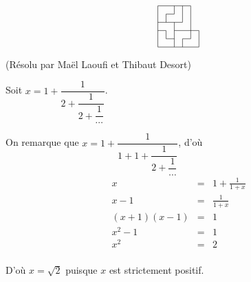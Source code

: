 \begin{sol}[34]
\[\begin{tikzpicture}[scale=0.3]
\draw (0, 0)--(0,5 );
\draw (1, 1)--(1,2 );
\draw (1, 3)--(1,4 );
\draw (2, 0)--(2,3 );
\draw (2, 4)--(2,5 );
\draw (3, 0)--(3,1 );
\draw (3, 3)--(3,5 );
\draw (4, 1)--(4,5 );
\draw (5, 0)--(5,2 );

\draw(0,0)--(5,0);
\draw(1,1)--(2,1);
\draw(3,1)--(4,1);
\draw(0,2)--(1,2);
\draw(2,2)--(5,2);
\draw(0,3)--(3,3);
\draw(1,4)--(2,4);
\draw(0,5)--(4,5);
\end{tikzpicture}\]

\end{sol}

\begin{sol}[42](Résolu par Maël Laoufi et Thibaut Desort)

Soit $x=1+\dfrac{1}{2+\dfrac{1}{2+\dfrac{1}{\cdots}}}$.

On remarque que $x=1+\dfrac{1}{1+1+\dfrac{1}{2+\dfrac{1}{\cdots}}}$, 
d'où 
\begin{eqnarray*}
x &=& 1+\frac{1}{1+x} \\
x-1 &=& \frac{1}{1+x}\\
(x+1)(x-1) &=& 1\\
x^2-1 &=& 1\\
x^2 &=& 2\\
\end{eqnarray*}

D'où $x=\sqrt{2}$ puisque $x$ est strictement positif.


\end{sol}


